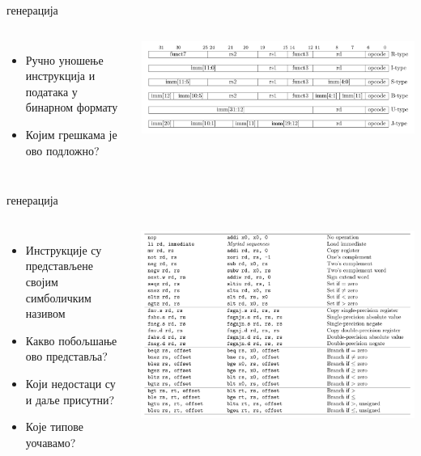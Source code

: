 \documentclass[xcolor=table]{beamer}
\begin{document}
    \begin{frame}{ генерација}
        \begin{columns}
            \begin{itemize}
                \item Ручно уношење инструкција и података у бинарном формату
                \item Којим грешкама је ово подложно?
            \end{itemize}
            
            \centering
            \includegraphics[width=0.7\textheight,keepaspectratio]{images/riscv_binary.png}
        \end{columns}
    \end{frame}
    
    \begin{frame}{ генерација}
        \begin{columns}
            \begin{itemize}
                \item Инструкције су представљене својим симболичким називом
                \item Какво побољшање ово представља?
                \item Који недостаци су и даље присутни?
                \item Које типове уочавамо?
            \end{itemize}
            
            \centering
            \includegraphics[width=0.7\textheight,keepaspectratio]{images/riscv_asm.png}
        \end{columns}
    \end{frame}
    
\end{document}

